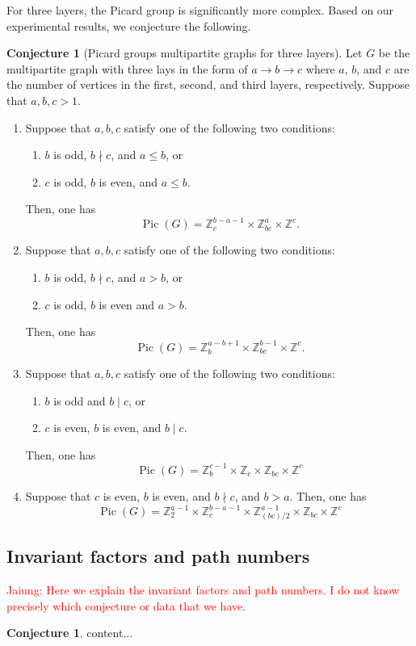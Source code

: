 \documentclass[11pt,reqno]{amsart}
\DeclareMathOperator{\Pic}{Pic}
\theoremstyle{definition}
\newtheorem{conj}[mydef]{Conjecture}
\theoremstyle{plain}
\begin{document}
For three layers, the Picard group is significantly more complex. Based on our experimental results, we conjecture the following.

\begin{conj}[Picard groups multipartite graphs for three layers]
Let $G$ be the multipartite graph with three lays in the form of $a \rightarrow b \rightarrow c$ where $a$, $b$, and $c$ are the number of vertices
in the first, second, and third layers, respectively. Suppose that $a,b,c >1$.
\begin{enumerate}
	\item 
Suppose that $a,b,c$ satisfy one of the following two conditions:
\begin{enumerate}
	\item 
$b$ is odd, $b \nmid c$, and $a \leq b$, or 	
	\item 
$c$ is odd, $b$ is even, and $a \leq b$.
\end{enumerate}
Then, one has
\[
\Pic(G) = \mathbb{Z}_{c}^{b-a-1} \times \mathbb{Z}_{bc}^{a} \times \mathbb{Z}^c.		
\]
\item 
Suppose that $a,b,c$ satisfy one of the following two conditions:
\begin{enumerate}
	\item 
	$b$ is odd, $b \nmid c$, and $a > b$, or 	
	\item 
	$c$ is odd, $b$ is even and $a > b$.
\end{enumerate}
Then, one has
	\[
\Pic(G) = \mathbb{Z}_{b}^{a-b+1} \times \mathbb{Z}_{bc}^{b-1} \times \mathbb{Z}^c.	
	\]
\item 
Suppose that $a,b,c$ satisfy one of the following two conditions:
\begin{enumerate}
	\item 
	$b$ is odd and $b \mid c$, or 	
	\item 
$c$ is even, $b$ is even, and $b \mid c$.
\end{enumerate}
Then, one has
\[
\Pic(G) = \mathbb{Z}_{b}^{c-1} \times \mathbb{Z}_{c} \times \mathbb{Z}_{bc} \times \mathbb{Z}^c
\]
\item 
Suppose that $c$ is even, $b$ is even, and $b \nmid c$, and $b>a$. Then, one has
\[
\Pic(G) = \mathbb{Z}_{2}^{a-1} \times \mathbb{Z}_{c}^{b-a-1} \times \mathbb{Z}_{(bc)/2}^{a-1} \times \mathbb{Z}_{bc} \times \mathbb{Z}^c
\]
\end{enumerate}
\end{conj}


\subsection{Invariant factors and path numbers}

\textcolor{red}{Jaiung: Here we explain the invariant factors and path numbers. I do not know precisely which conjecture or data that we have.}

\begin{conj}
	content...
\end{conj}



\end{document}
